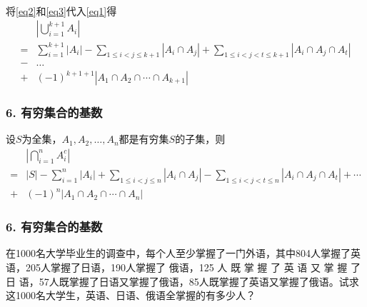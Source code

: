 \documentclass{beamer}
\begin{document}
\begin{CJK*}{UTF8}{gbsn}
\begin{frame}
\begin{equation}
\begin{split}
    \end{split}
  \end{equation}
\end{frame}
\begin{frame}
将\eqref{eq2}和\eqref{eq3}代入\eqref{eq1}得
  \begin{equation*}
    \begin{split}
    &|\bigcup_{i=1}^{k+1}A_i|\\
=&\sum_{i=1}^{k+1}|A_i| - \sum_{1\leq i < j \leq {k+1}}|A_i \cap A_j| + \sum_{1 \leq  i < j < t \leq {k+1}}|A_i \cap A_j \cap A_t|\\
-&\ldots\\
+&(-1)^{k+1+1}|A_1 \cap A_2 \cap \cdots \cap A_{k+1}|
\end{split}
\end{equation*}
\end{frame}

\begin{frame}
\frametitle{6. 有穷集合的基数}
\begin{Thm}
  设$S$为全集，$A_1, A_2, \ldots, A_n$都是有穷集$S$的子集，则
  \begin{equation*}
    \begin{split}
      &|\bigcap_{i=1}^nA_{i}^c|\\
=&|S| - \sum_{i=1}^n|A_i| + \sum_{1\leq i < j \leq n}|A_i \cap A_j|
-\sum_{1 \leq  i < j < t \leq n}|A_i \cap A_j \cap A_t| + \cdots \\
+&(-1)^n|A_1 \cap A_2 \cap \cdots \cap A_n|
    \end{split}
  \end{equation*}
\end{Thm}
\end{frame}

\begin{frame}
\frametitle{6. 有穷集合的基数}
\begin{Ex}
  在1000名大学毕业生的调查中，每个人至少掌握了一门外语，其中804人掌握了英语，205人掌握了日语，190人掌握了 俄语，125  人 既 掌 握 了 英 语 又 掌 握 了 日 语，57人既掌握了日语又掌握了俄语，85人既掌握了英语又掌握了俄语。试求这1000名大学生，英语、日语、俄语全掌握的有多少人？
\end{Ex}
\end{frame}


\end{CJK*}
\end{document}
